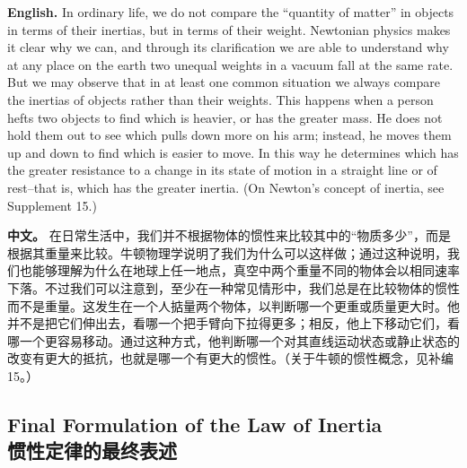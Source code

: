 \noindent\textbf{English.} In ordinary life, we do not compare the ``quantity of matter'' in objects in terms of their inertias, but in terms of their weight. Newtonian physics makes it clear why we can, and through its clarification we are able to understand why at any place on the earth two unequal weights in a vacuum fall at the same rate. But we may observe that in at least one common situation we always compare the inertias of objects rather than their weights. This happens when a person hefts two objects to find which is heavier, or has the greater mass. He does not hold them out to see which pulls down more on his arm; instead, he moves them up and down to find which is easier to move. In this way he determines which has the greater resistance to a change in its state of motion in a straight line or of rest--that is, which has the greater inertia. (On Newton's concept of inertia, see Supplement 15.)
\par\noindent\textbf{中文。} 在日常生活中，我们并不根据物体的惯性来比较其中的“物质多少”，而是根据其重量来比较。牛顿物理学说明了我们为什么可以这样做；通过这种说明，我们也能够理解为什么在地球上任一地点，真空中两个重量不同的物体会以相同速率下落。不过我们可以注意到，至少在一种常见情形中，我们总是在比较物体的惯性而不是重量。这发生在一个人掂量两个物体，以判断哪一个更重或质量更大时。他并不是把它们伸出去，看哪一个把手臂向下拉得更多；相反，他上下移动它们，看哪一个更容易移动。通过这种方式，他判断哪一个对其直线运动状态或静止状态的改变有更大的抵抗，也就是哪一个有更大的惯性。（关于牛顿的惯性概念，见补编15。）
\medskip

\subsection*{Final Formulation of the Law of Inertia\\惯性定律的最终表述}

